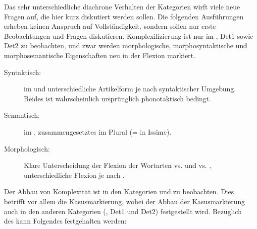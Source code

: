 Das sehr unterschiedliche diachrone Verhalten der Kategorien wirft viele neue Fragen auf, die hier kurz diskutiert werden sollen. Die folgenden Ausführungen erheben keinen Anspruch auf Vollständigkeit, sondern sollen nur erste Beobachtungen und Fragen diskutieren. Komplexifizierung ist nur im , Det1 sowie Det2 zu beobachten, und zwar werden morphologische, morphosyntaktische und morphosemantische Eigenschaften neu in der Flexion markiert.

\begin{description}
\item[Syntaktisch:]  im  und unterschiedliche Artikelform je nach syntaktischer Umgebung. Beides ist wahrscheinlich ursprünglich phonotaktisch bedingt.
\item[Semantisch:]  im , zusammengesetztes  im Plural (=  in Issime).
\item[Morphologisch:] Klare Unterscheidung der Flexion der Wortarten  vs.  und  vs. , unterschiedliche Flexion je nach .
\end{description}

Der Abbau von Komplexität ist in den Kategorien  und  zu beobachten. Dies betrifft vor allem die Kasusmarkierung, wobei der Abbau der Kasusmarkierung auch in den anderen Kategorien (, Det1 und Det2) festgestellt wird. Bezüglich des  kann Folgendes festgehalten werden:

